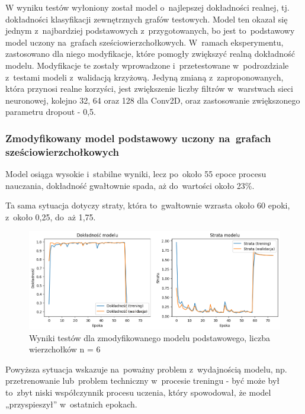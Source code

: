 W wyniku testów wyłoniony został model o~najlepszej dokładności realnej, tj.
dokładności klasyfikacji zewnętrznych grafów testowych.
Model ten okazał się jednym z~najbardziej podstawowych z~przygotowanych,
bo jest to~podstawowy model uczony na~grafach sześciowierzchołkowych.
W~ramach eksperymentu, zastosowano dla niego modyfikacje,
które pomogły zwiększyć realną dokładność modelu.
Modyfikacje te zostały wprowadzone i~przetestowane w~podrozdziale z~testami modeli
z~walidacją krzyżową.
Jedyną zmianą z~zaproponowanych, która przynosi realne korzyści,
jest zwiększenie liczby filtrów w~warstwach sieci neuronowej, kolejno 32, 64 oraz 128 dla Conv2D,
oraz zastosowanie zwiększonego parametru dropout - 0,5.

\subsubsection{Zmodyfikowany model podstawowy uczony na~grafach sześciowierzchołkowych}

Model osiąga wysokie i~stabilne wyniki, lecz po~około 55 epoce procesu nauczania,
dokładność gwałtownie spada, aż do~wartości około 23\%.

Ta sama sytuacja dotyczy straty, która to~gwałtownie wzrasta około 60 epoki,
z~około 0,25, do~aż 1,75.

\begin{figure}[ht]
	\centering
	\includegraphics[width=15.5cm]{resources/tests/images/v4/base6_1_img.png}
	\caption{Wyniki testów dla zmodyfikowanego modelu podstawowego, liczba wierzchołków n = 6}
	\label{Fig:tests-best-0a}
\end{figure}
\FloatBarrier

Powyższa sytuacja wskazuje na~poważny problem z~wydajnością modelu,
np. przetrenowanie lub~problem techniczny w~procesie treningu
- być może był to~zbyt niski współczynnik procesu uczenia,
który spowodował, że model „przyspieszył” w~ostatnich epokach.


